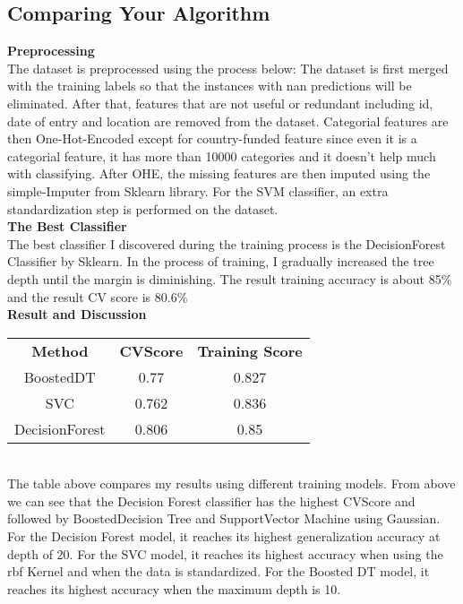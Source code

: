 \documentclass{article}
\begin{document}
   \subsection{Comparing Your Algorithm}
   \textbf{Preprocessing}
   \\ The dataset is preprocessed using the process below: The dataset is first merged with the training labels so that the instances with nan predictions will be eliminated. After that, features that are not useful or redundant including id, date of entry and location are removed from the dataset. Categorial features are then One-Hot-Encoded except for country-funded feature since even it is a categorial feature, it has more than 10000 categories and it doesn't help much with classifying. After OHE, the missing features are then imputed using the simple-Imputer from Sklearn library. For the SVM classifier, an extra standardization step is performed on the dataset.
   \\
   \textbf{The Best Classifier}
     \\The best classifier I discovered during the training process is the DecisionForest Classifier by Sklearn. In the process of training, I gradually increased the tree depth until the margin is diminishing. The result training accuracy is about 85\% and the result CV score is 80.6\%
   \\
   \textbf{Result and Discussion}
   \\
\begin{center}
\begin{tabular}{ c c c }
 \textbf{Method} &  \textbf{CVScore}&  \textbf{Training Score} \\ 
 BoostedDT & 0.77 & 0.827 \\  
 SVC & 0.762 & 0.836 \\
 DecisionForest &0.806 &0.85\\
 
  
\end{tabular}
\end{center}
\\The table above compares my results using different training models. From above we can see that the Decision Forest classifier has the highest CVScore and followed by BoostedDecision Tree and SupportVector Machine using Gaussian. For the Decision Forest model, it reaches its highest generalization accuracy at depth of 20. For the SVC model, it reaches its highest accuracy when using the rbf Kernel and when the data is standardized. For the Boosted DT model, it reaches its highest accuracy when the maximum depth is 10.
 
    
   

        
\end{document}

